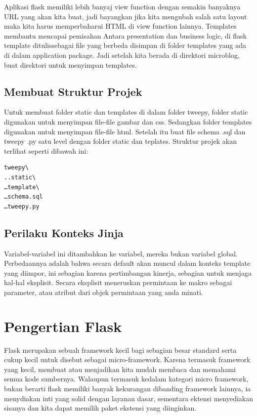 Aplikasi flask memiliki lebih banyaj view function dengan semakin banyaknya URL yang akan kita buat, jadi bayangkan jika kita mengubah 
salah satu layout maka kita harus memperbaharui HTML di view function lainnya.  Templates membantu mencapai pemisahan Antara 
presentation 
dan business logic, di flask template ditulissebagai file yang berbeda disimpan di folder templates yang ada di dalam application 
package. 
Jadi setelah kita berada di direktori microblog, buat direktori untuk menyimpan templates. 

\subsection{Membuat Struktur Projek}
Untuk membuat folder static dan templates di dalam folder tweepy, folder static digunakan untuk menyimpan file-file gambar dan css. 
Sedangkan folder templates digunakan untuk menyimpan file-file html. Setelah itu buat file schema .sql dan tweepy .py satu level dengan 
folder static dan teplates. Struktur projek akan terlihat seperti dibawah ini:
\begin{verbatim}
tweepy\
..static\
…template\
…schema.sql
…tweepy.py
\end{verbatim}

\subsection{Perilaku Konteks Jinja}
Variabel-variabel ini ditambahkan ke variabel, mereka bukan variabel global. Perbedaannya adalah bahwa secara default akan muncul dalam 
konteks template yang diimpor, ini sebagian karena pertimbangan kinerja, sebagian untuk menjaga hal-hal eksplisit. Secara eksplisit 
meneruskan permintaan ke makro sebagai parameter, atau atribut dari objek permintaan yang anda minati. 

\section{Pengertian Flask}
Flask merupakan sebuah framework kecil bagi sebagian besar standard serta cukup kecil untuk disebut sebagai micro-framework. 
Karena termasuk framework yang kecil, membuat atau menjadikan kita mudah membaca dan memahami semua kode sumbernya. 
Walaupun termasuk kedalam kategori micro framework, bukan berarti flask memiliki banyak kekurangan dibanding framework lainnya, ia menydiakan inti yang solid dengan layanan dasar, sementara ektensi menyediakan sisanya dan kita dapat memilih paket ekstensi yang diinginkan.

